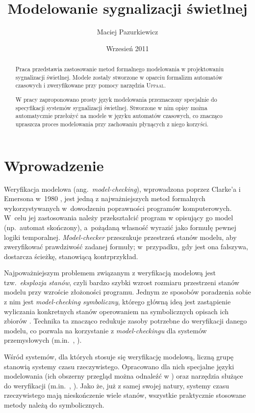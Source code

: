 \documentclass{pracamgr}
\author{Maciej Pazurkiewicz}
\title{Modelowanie sygnalizacji świetlnej}
\date{Wrzesień 2011}
\newcommand{\ang}[1]{(ang.~\emph{#1})}
\newcommand{\upp}{\textsc{Uppaal}}
\theoremstyle{plain}
\begin{document}
\maketitle

\begin{abstract}
  Praca przedstawia zastosowanie metod formalnego modelowania w
  projektowaniu sygnalizacji świetlnej. Modele zostały stworzone w
  oparciu formalizm automatów czasowych i zweryfikowane przy pomocy
  narzędzia \upp.

  W pracy zaproponowano prosty język modelowania przeznaczony
  specjalnie do specyfikacji systemów sygnalizacji
  świetlnej. Stworzone w nim opisy można automatycznie przełożyć na
  modele w języku automatów czasowych, co znacząco upraszcza proces
  modelowania przy zachowaniu płynących z niego korzyści.
\end{abstract}

\tableofcontents
{}
\chapter*{Wprowadzenie}

Weryfikacja modelowa \ang{model-checking}, wprowadzona poprzez
Clarke'a i Emersona w~1980 \cite{clarke-emerson-mc}, jest jedną z
najważniejszych metod formalnych wykorzystywanych w~dowodzeniu
poprawności programów komputerowych. W~celu jej zastosowania należy
przekształcić program w opisujący go model (np.~automat skończony),
a~pożądaną własność wyrazić jako formułę pewnej logiki
temporalnej. \emph{Model-checker} przeszukuje przestrzeń stanów
modelu, aby zweryfikować prawdziwość zadanej formuły; w~przypadku, gdy
jest ona fałszywa, dostarcza ścieżkę, stanowiącą
kontrprzykład.

Najpoważniejszym problemem związanym z weryfikacją
modelową jest tzw.~\emph{eksplozja stanów}, czyli bardzo szybki wzrost
rozmiaru przestrzeni stanów modelu przy wzroście złożoności
programu. Jednym ze sposobów poradzenia sobie z nim jest
\emph{model-checking symboliczny}, którego główną ideą jest
zastąpienie wyliczania konkretnych stanów operowaniem na symbolicznych
opisach ich zbiorów \cite{mcmillan-smc}. Technika ta znacząco redukuje
zasoby potrzebne do weryfikacji danego modelu, co pozwala na
korzystanie z \emph{model-checkingu} dla systemów przemysłowych
(m.in.~\cite{smc-industry-1}, \cite{smc-industry-2}).

Wśród systemów, dla których stosuje się weryfikację modelową, liczną
grupę stanowią systemy czasu rzeczywistego. Opracowano dla nich
specjalne języki modelowania (ich obszerny przegląd można odnaleźć w
\cite{time-in-computing}) oraz narzędzia służące do weryfikacji
(m.in.~\cite{lpw:fct95}, \cite{kronos}). Jako że, już z samej swojej
natury, systemy czasu rzeczywistego mają nieskończenie wiele stanów,
wszystkie praktycznie stosowane metody należą do symbolicznych.
\end{document}
